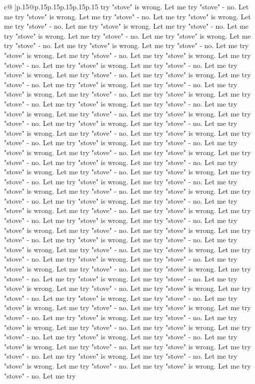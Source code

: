 \documentclass{article}
\begin{document}
{\begin{supertabular}{c@{$\;$}|p{.15\linewidth}@{}p{.15\linewidth}p{.15\linewidth}p{.15\linewidth}p{.15\linewidth}p{.15\linewidth}}
{{{try "stove" is wrong. Let me try "stove" {-} no. Let me try "stove" is wrong. Let me try "stove" {-} no. Let me try "stove" is wrong. Let me try "stove" {-} no. Let me try "stove" is wrong. Let me try "stove" {-} no. Let me try "stove" is wrong. Let me try "stove" {-} no. Let me try "stove" is wrong. Let me try "stove" {-} no. Let me try "stove" is wrong. Let me try "stove" {-} no. Let me try "stove" is wrong. Let me try "stove" {-} no. Let me try "stove" is wrong. Let me try "stove" {-} no. Let me try "stove" is wrong. Let me try "stove" {-} no. Let me try "stove" is wrong. Let me try "stove" {-} no. Let me try "stove" is wrong. Let me try "stove" {-} no. Let me try "stove" is wrong. Let me try "stove" {-} no. Let me try "stove" is wrong. Let me try "stove" {-} no. Let me try "stove" is wrong. Let me try "stove" {-} no. Let me try "stove" is wrong. Let me try "stove" {-} no. Let me try "stove" is wrong. Let me try "stove" {-} no. Let me try "stove" is wrong. Let me try "stove" {-} no. Let me try "stove" is wrong. Let me try "stove" {-} no. Let me try "stove" is wrong. Let me try "stove" {-} no. Let me try "stove" is wrong. Let me try "stove" {-} no. Let me try "stove" is wrong. Let me try "stove" {-} no. Let me try "stove" is wrong. Let me try "stove" {-} no. Let me try "stove" is wrong. Let me try "stove" {-} no. Let me try "stove" is wrong. Let me try "stove" {-} no. Let me try "stove" is wrong. Let me try "stove" {-} no. Let me try "stove" is wrong. Let me try "stove" {-} no. Let me try "stove" is wrong. Let me try "stove" {-} no. Let me try "stove" is wrong. Let me try "stove" {-} no. Let me try "stove" is wrong. Let me try "stove" {-} no. Let me try "stove" is wrong. Let me try "stove" {-} no. Let me try "stove" is wrong. Let me try "stove" {-} no. Let me try "stove" is wrong. Let me try "stove" {-} no. Let me try "stove" is wrong. Let me try "stove" {-} no. Let me try "stove" is wrong. Let me try "stove" {-} no. Let me try "stove" is wrong. Let me try "stove" {-} no. Let me try "stove" is wrong. Let me try "stove" {-} no. Let me try "stove" is wrong. Let me try "stove" {-} no. Let me try "stove" is wrong. Let me try "stove" {-} no. Let me try "stove" is wrong. Let me try "stove" {-} no. Let me try "stove" is wrong. Let me try "stove" {-} no. Let me try "stove" is wrong. Let me try "stove" {-} no. Let me try "stove" is wrong. Let me try "stove" {-} no. Let me try "stove" is wrong. Let me try "stove" {-} no. Let me try "stove" is wrong. Let me try "stove" {-} no. Let me try "stove" is wrong. Let me try "stove" {-} no. Let me try "stove" is wrong. Let me try "stove" {-} no. Let me try "stove" is wrong. Let me try "stove" {-} no. Let me try "stove" is wrong. Let me try "stove" {-} no. Let me try "stove" is wrong. Let me try "stove" {-} no. Let me try "stove" is wrong. Let me try "stove" {-} no. Let me try "stove" is wrong. Let me try "stove" {-} no. Let me try "stove" is wrong. Let me try "stove" {-} no. Let me try "stove" is wrong. Let me try "stove" {-} no. Let me try "stove" is wrong. Let me try "stove" {-} no. Let me try "stove" is wrong. Let me try "stove" {-} no. Let me try "stove" is wrong. Let me try "stove" {-} no. Let me try }}}
\end{supertabular}}
\end{document}
